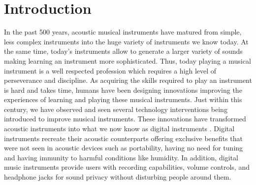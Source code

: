 \documentclass[sigchi, review]{acmart}
\begin{document}
\maketitle

\section{Introduction}
In the past 500 years, acoustic musical instruments have matured from simple, less complex instruments into the huge variety of instruments we know today. At the same time, today's instruments allow to generate a larger variety of sounds making learning an instrument more sophisticated. Thus, today playing a musical instrument is a well respected profession which requires a high level of perseverance and discipline. As acquiring the skills required to play an instrument is hard and takes time, humans have been designing innovations improving the experiences of learning and playing these musical instruments. Just within this century, we have observed and seen several technology interventions being introduced to improve musical instruments. These innovations have transformed acoustic instruments into what we now know as digital instruments \cite{magnusson2007acoustic}. Digital instruments recreate their acoustic counterparts offering exclusive benefits that were not seen in acoustic devices such as portability, having no need for tuning and having immunity to harmful conditions like humidity. In addition, digital music instruments provide users with recording capabilities, volume controls, and headphone jacks for sound privacy without disturbing people around them. %
\end{document}
